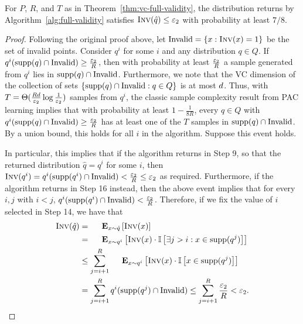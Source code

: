 \begin{lemma}
\label{lem:vc-full-validity-inv}
For $P$, $R$, and $T$ as in Theorem~\ref{thm:vc-full-validity}, 
the distribution returns by Algorithm~\ref{alg:full-validity} satisfies $\textsc{Inv}(\hat{q}) \leq \varepsilon_{2}$ with probability at least $7/8$.
\end{lemma}
\begin{proof}
Following the original proof above, 
let $\text{Invalid} = \{x : \textsc{Inv}(x) = 1 \}$ be the set of invalid points.
Consider $q^i$ for some $i$ and any distribution $q \in Q$. 
If $q^i( \text{supp}(q) \cap \text{Invalid} ) \ge \frac { \varepsilon_2 } { R }$, 
then with probability at least $\frac { \varepsilon_2 } { R }$ a sample generated from $q^i$ lies in $\text{supp}(q) \cap \text{Invalid}$. 
Furthermore, we note that the VC dimension of the collection of sets $\{ \text{supp}(q) \cap \text{Invalid} : q \in Q \}$ is at most $d$.
Thus, with $T = \Theta( \frac  { R d } { \varepsilon_2 } \log \frac{1}{\varepsilon_2} )$ samples from $q^i$, 
the classic sample complexity result from PAC learning \cite{VapnikC74,BlumerEHW89} implies %
that with probability at least $1 - \frac{1}{8 R}$, 
every $q \in Q$ with $q^i( \text{supp}(q) \cap \text{Invalid} ) \geq \frac{\varepsilon_{2}}{R}$ 
has at least one of the $T$ samples in $\text{supp}(q) \cap \text{Invalid}$. 
By a union bound, this holds for all $i$ in the algorithm.  Suppose this event holds.

In particular, this implies that if the algorithm returns in Step 9, so that the returned distribution $\hat{q} = q^i$ for some $i$, 
then $\textsc{Inv}(q^i) = q^i( \text{supp}(q^i) \cap \text{Invalid} ) < \frac { \varepsilon_2 } { R } \le \varepsilon_2 $ as required.
Furthermore, if the algorithm returns in Step 16 instead, then the above event implies that for every $i,j$ with $i < j$, 
$q^i( \text{supp}(q^i) \cap \text{Invalid} ) < \frac { \varepsilon_2 } { R }$.
Therefore, if we fix the value of $i$ selected in Step 14, we have that 
 \begin{align*}
    \Inv(\hat q) 
&= \Exp_{x\sim\hat q}\left[ \Inv(x) \right] \\
&= \Exp_{x\sim q^i}\left[ \Inv(x) \cdot \Ind\left[\exists j > i: x \in \Supp(q^j) \right]\right] \\
&\le  \sum_{j=i+1}^R \Exp_{x\sim q^i}\left[ \Inv(x) \cdot \Ind\left[ x \in \Supp(q^j) \right] \right] \\  
&= \sum_{j=i+1}^R q^i( \Supp(q^j) \cap \text{Invalid} ) \le  \sum_{j=i+1}^R \frac { \eps_2 } { R } <  \eps_2.
  \end{align*}
\end{proof}

